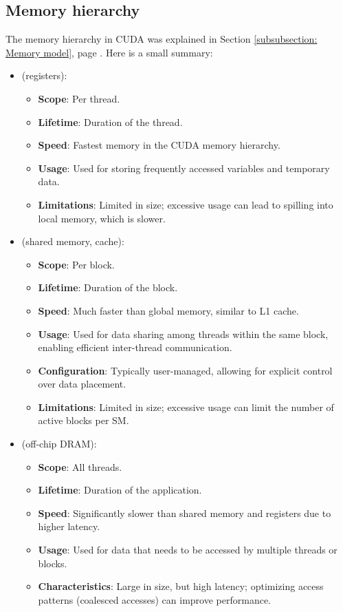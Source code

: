 \subsection{Memory hierarchy}

The memory hierarchy in CUDA was explained in Section \ref{subsubsection: Memory model}, page \pageref{subsubsection: Memory model}. Here is a small summary:
\begin{itemize}
    \item {} (registers):
    \begin{itemize}
        \item \textbf{Scope}: Per thread.
        \item \textbf{Lifetime}: Duration of the thread.
        \item \textbf{Speed}: Fastest memory in the CUDA memory hierarchy.
        \item \textbf{Usage}: Used for storing frequently accessed variables and temporary data.
        \item \textbf{Limitations}: Limited in size; excessive usage can lead to spilling into local memory, which is slower.
    \end{itemize}

    \item {} (shared memory, cache):
    \begin{itemize}
        \item \textbf{Scope}: Per block.
        \item \textbf{Lifetime}: Duration of the block.
        \item \textbf{Speed}: Much faster than global memory, similar to L1 cache.
        \item \textbf{Usage}: Used for data sharing among threads within the same block, enabling efficient inter-thread communication.
        \item \textbf{Configuration}: Typically user-managed, allowing for explicit control over data placement.
        \item \textbf{Limitations}: Limited in size; excessive usage can limit the number of active blocks per SM.
    \end{itemize}

    \item {} (off-chip DRAM):
    \begin{itemize}
        \item \textbf{Scope}: All threads.
        \item \textbf{Lifetime}: Duration of the application.
        \item \textbf{Speed}: Significantly slower than shared memory and registers due to higher latency.
        \item \textbf{Usage}: Used for data that needs to be accessed by multiple threads or blocks.
        \item \textbf{Characteristics}: Large in size, but high latency; optimizing access patterns (coalesced accesses) can improve performance.
    \end{itemize}
\end{itemize}

